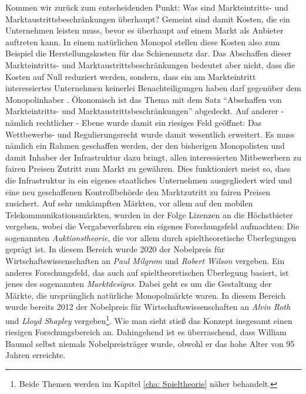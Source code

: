 Kommen wir zurück zum entscheidenden Punkt: Was sind Markteintritts- und Marktaustrittsbeschränkungen überhaupt? Gemeint sind damit Kosten, die ein Unternehmen leisten muss, bevor es überhaupt auf einem Markt als Anbieter auftreten kann. In einem natürlichen Monopol stellen diese Kosten also zum Beispiel die Herstellungskosten für das Schienennetz dar. Das Abschaffen dieser Markteintritts- und Marktaustrittsbeschränkungen bedeutet aber nicht, dass die Kosten auf Null reduziert werden, sondern, dass ein am Markteintritt interessiertes Unternehmen keinerlei Benachteiligungen haben darf gegenüber dem Monopolinhaber \parencite[S. 3f.]{Baumol1982b}. Ökonomisch ist das Thema mit dem Satz "`Abschaffen von Markteintritts- und Marktaustrittsbeschränkungen"' abgedeckt. Auf anderer - nämlich rechtlicher - Ebene wurde damit ein riesiges Feld geöffnet: Das Wettbewerbs- und Regulierungsrecht wurde damit wesentlich erweitert. Es muss nämlich ein Rahmen geschaffen werden, der den bisherigen Monopolisten und damit Inhaber der Infrastruktur dazu bringt, allen interessierten Mitbewerbern zu fairen Preisen Zutritt zum Markt zu gewähren. Dies funktioniert meist so, dass die Infrastruktur in ein eigenes staatliches Unternehmen ausgegliedert wird und eine neu geschaffenen Kontrollbehörde den Marktzutritt zu fairen Preisen zusichert. Auf sehr umkämpften Märkten, vor allem auf den mobilen Telekommunikationsmärkten, wurden in der Folge Lizenzen an die Höchstbieter vergeben, wobei die Vergabeverfahren ein eigenes Forschungsfeld aufmachten: Die sogenannten \textit{Auktionstheorie}, die vor allem durch spieltheoretische Überlegungen geprägt ist. In diesem Bereich wurde 2020 der Nobelpreis für Wirtschaftswissenschaften an \textit{Paul Milgrom} und \textit{Robert Wilson} vergeben. Ein anderes Forschungsfeld, das auch auf spieltheoretischen Überlegung basiert, ist jenes des sogenannten \textit{Marktdesigns}. Dabei geht es um die Gestaltung der Märkte, die ursprünglich natürliche Monopolmärkte waren. In diesem Bereich wurde bereits 2012 der Nobelpreis für Wirtschaftswissenschaften an \textit{Alvin Roth} und \textit{Lloyd Shapley} vergeben\footnote{Beide Themen werden im Kapitel \ref{cha: Spieltheorie} näher behandelt.}. Wie man sieht stieß das Konzept insgesamt einen riesigen Forschungsbereich an. Dahingehend ist es überraschend, dass William Baumol selbst niemals Nobelpreisträger wurde, obwohl er das hohe Alter von 95 Jahren erreichte. 

